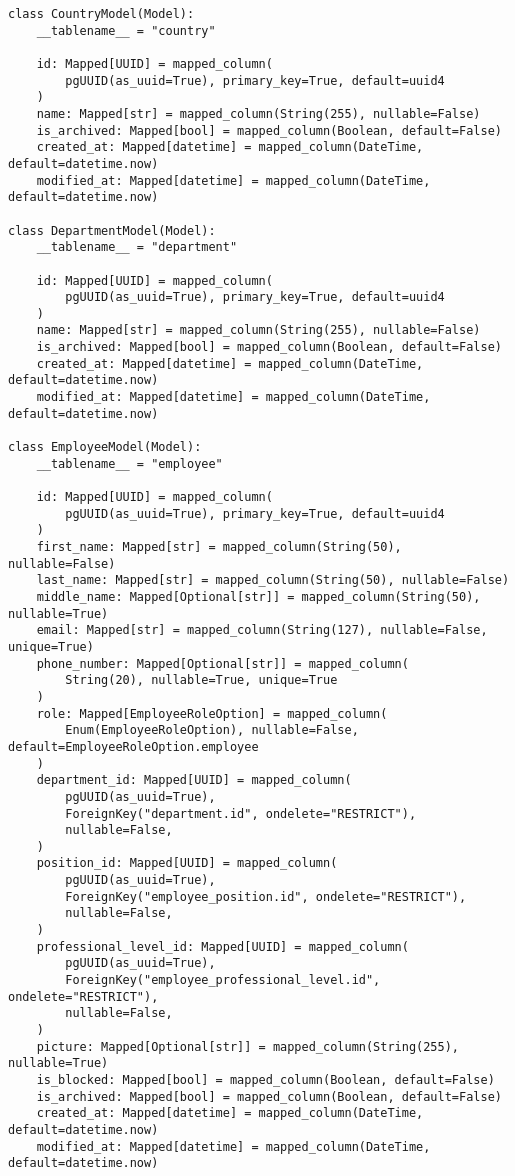 \begin{lstlisting}[style=pythonstyle]
class CountryModel(Model):
    __tablename__ = "country"

    id: Mapped[UUID] = mapped_column(
        pgUUID(as_uuid=True), primary_key=True, default=uuid4
    )
    name: Mapped[str] = mapped_column(String(255), nullable=False)
    is_archived: Mapped[bool] = mapped_column(Boolean, default=False)
    created_at: Mapped[datetime] = mapped_column(DateTime, default=datetime.now)
    modified_at: Mapped[datetime] = mapped_column(DateTime, default=datetime.now)

class DepartmentModel(Model):
    __tablename__ = "department"

    id: Mapped[UUID] = mapped_column(
        pgUUID(as_uuid=True), primary_key=True, default=uuid4
    )
    name: Mapped[str] = mapped_column(String(255), nullable=False)
    is_archived: Mapped[bool] = mapped_column(Boolean, default=False)
    created_at: Mapped[datetime] = mapped_column(DateTime, default=datetime.now)
    modified_at: Mapped[datetime] = mapped_column(DateTime, default=datetime.now)

class EmployeeModel(Model):
    __tablename__ = "employee"

    id: Mapped[UUID] = mapped_column(
        pgUUID(as_uuid=True), primary_key=True, default=uuid4
    )
    first_name: Mapped[str] = mapped_column(String(50), nullable=False)
    last_name: Mapped[str] = mapped_column(String(50), nullable=False)
    middle_name: Mapped[Optional[str]] = mapped_column(String(50), nullable=True)
    email: Mapped[str] = mapped_column(String(127), nullable=False, unique=True)
    phone_number: Mapped[Optional[str]] = mapped_column(
        String(20), nullable=True, unique=True
    )
    role: Mapped[EmployeeRoleOption] = mapped_column(
        Enum(EmployeeRoleOption), nullable=False, default=EmployeeRoleOption.employee
    )
    department_id: Mapped[UUID] = mapped_column(
        pgUUID(as_uuid=True),
        ForeignKey("department.id", ondelete="RESTRICT"),
        nullable=False,
    )
    position_id: Mapped[UUID] = mapped_column(
        pgUUID(as_uuid=True),
        ForeignKey("employee_position.id", ondelete="RESTRICT"),
        nullable=False,
    )
    professional_level_id: Mapped[UUID] = mapped_column(
        pgUUID(as_uuid=True),
        ForeignKey("employee_professional_level.id", ondelete="RESTRICT"),
        nullable=False,
    )
    picture: Mapped[Optional[str]] = mapped_column(String(255), nullable=True)
    is_blocked: Mapped[bool] = mapped_column(Boolean, default=False)
    is_archived: Mapped[bool] = mapped_column(Boolean, default=False)
    created_at: Mapped[datetime] = mapped_column(DateTime, default=datetime.now)
    modified_at: Mapped[datetime] = mapped_column(DateTime, default=datetime.now)


\end{lstlisting}
